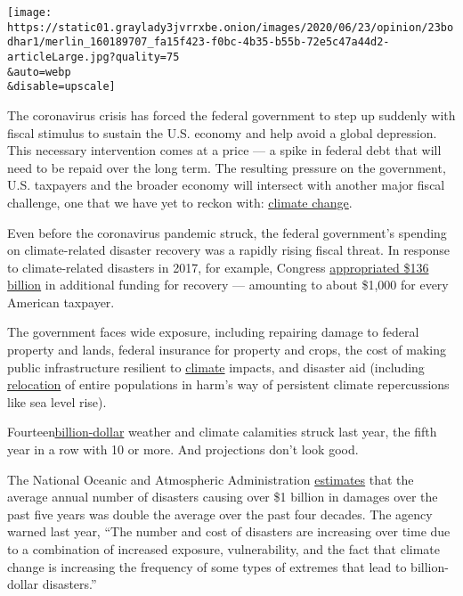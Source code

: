 \texttt{[image: https://static01.graylady3jvrrxbe.onion/images/2020/06/23/opinion/23bodhar1/merlin\_160189707\_fa15f423-f0bc-4b35-b55b-72e5c47a44d2-articleLarge.jpg?quality=75\\\&auto=webp\\\&disable=upscale]}

The coronavirus crisis has forced the federal government to step up
suddenly with fiscal stimulus to sustain the U.S. economy and help avoid
a global depression. This necessary intervention comes at a price --- a
spike in federal debt that will need to be repaid over the long term.
The resulting pressure on the government, U.S. taxpayers and the broader
economy will intersect with another major fiscal challenge, one that we
have yet to reckon with:
\href{https://www.nytimes3xbfgragh.onion/2020/07/14/us/politics/biden-climate-plan.html}{climate
change}.

Even before the coronavirus pandemic struck, the federal government's
spending on climate-related disaster recovery was a rapidly rising
fiscal threat. In response to climate-related disasters in 2017, for
example, Congress
\href{https://fas.org/sgp/crs/homesec/R45084.pdf}{appropriated \$136
billion} in additional funding for recovery --- amounting to about
\$1,000 for every American taxpayer.

The government faces wide exposure, including repairing damage to
federal property and lands, federal insurance for property and crops,
the cost of making public infrastructure resilient to
\href{https://www.nytimes3xbfgragh.onion/2020/07/14/us/politics/biden-climate-plan.html}{climate}
impacts, and disaster aid (including
\href{https://www.npr.org/2017/01/10/509176361/alaskan-village-citing-climate-change-seeks-disaster-relief-in-order-to-relocate\#:~:text=Alaska\%20Climate\%20Change\%3A\%20Village\%20Makes\%20Historic\%20Request\%20To\%20Be\%20Declared,needs\%20to\%20move\%20the\%20community.}{relocation}
of entire populations in harm's way of persistent climate repercussions
like sea level rise).

Fourteen\href{https://www.climate.gov/news-features/blogs/beyond-data/2010-2019-landmark-decade-us-billion-dollar-weather-and-climate}{billion-dollar}
weather and climate calamities struck last year, the fifth year in a row
with 10 or more. And projections don't look good.

The National Oceanic and Atmospheric Administration
\href{https://www.ncdc.noaa.gov/billions/}{estimates} that the average
annual number of disasters causing over \$1 billion in damages over the
past five years was double the average over the past four decades. The
agency warned last year, ``The number and cost of disasters are
increasing over time due to a combination of increased exposure,
vulnerability, and the fact that climate change is increasing the
frequency of some types of extremes that lead to billion-dollar
disasters.''

